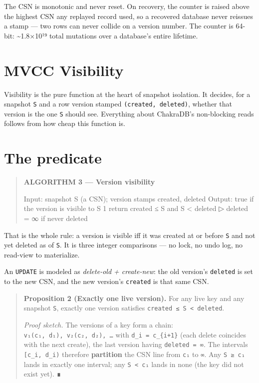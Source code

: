 \documentclass[
  11pt,
  openany]{book}
\newenvironment{Shaded}{}{}
\newcommand{\NormalTok}[1]{#1}
\begin{document}
The CSN is monotonic and never reset. On recovery, the counter is raised
above the highest CSN any replayed record used, so a recovered database
never reissues a stamp --- two rows can never collide on a version
number. The counter is 64-bit: \textasciitilde1.8×10¹⁹ total mutations
over a database's entire lifetime.

\section{MVCC Visibility}\label{mvcc-visibility}

Visibility is the pure function at the heart of snapshot isolation. It
decides, for a snapshot \texttt{S} and a row version stamped
\texttt{(created,\ deleted)}, whether that version is the one \texttt{S}
should see. Everything about ChakraDB's non-blocking reads follows from
how cheap this function is.

\section{The predicate}\label{the-predicate}

\begin{quote}
\textbf{ALGORITHM 3 --- Version visibility}

\begin{Shaded}
\begin{Highlighting}[]
\NormalTok{Input:  snapshot S (a CSN); version stamps created, deleted}
\NormalTok{Output: true if the version is visible to S}
\NormalTok{1  return created ≤ S  and  S \textless{} deleted            ▷ deleted = ∞ if never deleted}
\end{Highlighting}
\end{Shaded}
\end{quote}

That is the whole rule: a version is visible iff it was created at or
before \texttt{S} and not yet deleted as of \texttt{S}. It is three
integer comparisons --- no lock, no undo log, no read-view to
materialize.

An \texttt{UPDATE} is modeled as \emph{delete-old + create-new}: the old
version's \texttt{deleted} is set to the new CSN, and the new version's
\texttt{created} is that same CSN.

\begin{quote}
\textbf{Proposition 2 (Exactly one live version).} For any live key and
any snapshot \texttt{S}, exactly one version satisfies
\texttt{created\ ≤\ S\ \textless{}\ deleted}.

\emph{Proof sketch.} The versions of a key form a chain:
\texttt{v₁(c₁,\ d₁),\ v₂(c₂,\ d₂),\ …} with \texttt{d\_i\ =\ c\_\{i+1\}}
(each delete coincides with the next create), the last version having
\texttt{deleted\ =\ ∞}. The intervals \texttt{{[}c\_i,\ d\_i)} therefore
\textbf{partition} the CSN line from \texttt{c₁} to \texttt{∞}. Any
\texttt{S\ ≥\ c₁} lands in exactly one interval; any
\texttt{S\ \textless{}\ c₁} lands in none (the key did not exist yet). ∎
\end{quote}
\end{document}
